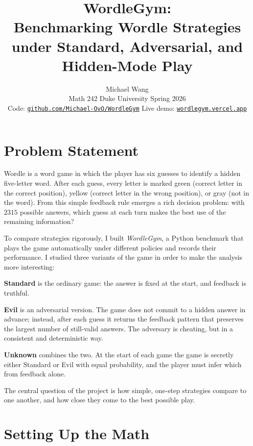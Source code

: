 \documentclass[11pt]{article}
\title{\textbf{WordleGym:}\\[2pt]\large Benchmarking Wordle Strategies under Standard, Adversarial, and Hidden-Mode Play}
\author{Michael Wang\\
\small Math 242 \textbullet{} Duke University \textbullet{} Spring 2026\\
\small Code: \href{https://github.com/Michael-OvO/WordleGym}{\texttt{github.com/Michael-OvO/WordleGym}}
  \textbullet{}
  Live demo: \href{https://wordlegym.vercel.app/}{\texttt{wordlegym.vercel.app}}}
\date{}
\begin{document}
\maketitle

\section*{Problem Statement}

Wordle is a word game in which the player has six guesses to identify a
hidden five-letter word. After each guess, every letter is marked
green (correct letter in the correct position), yellow (correct letter
in the wrong position), or gray (not in the word). From this simple
feedback rule emerges a rich decision problem: with $\num{2315}$
possible answers, which guess at each turn makes the best use of the
remaining information?

To compare strategies rigorously, I built \emph{WordleGym}, a Python
benchmark that plays the game automatically under different policies
and records their performance. I studied three variants of the game in
order to make the analysis more interesting:

\textbf{Standard} is the ordinary game: the answer is fixed at the
start, and feedback is truthful.

\textbf{Evil} is an adversarial version. The game does not commit to
a hidden answer in advance; instead, after each guess it returns the
feedback pattern that preserves the largest number of still-valid
answers. The adversary is cheating, but in a consistent and
deterministic way.

\textbf{Unknown} combines the two. At the start of each game the game
is secretly either Standard or Evil with equal probability, and the
player must infer which from feedback alone.

The central question of the project is how simple, one-step strategies
compare to one another, and how close they come to the best possible
play.

\section*{Setting Up the Math}
\end{document}
